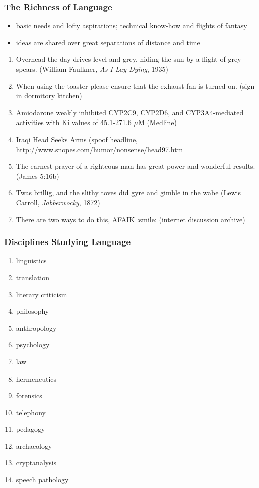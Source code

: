 \documentclass{beamer}             %
\begin{document}
\begin{frame}
\frametitle{The Richness of Language}
\begin{itemize}
\item basic needs and lofty aspirations; technical know-how and
  flights of fantasy
\item ideas are shared over great separations of distance and time
\end{itemize}

\scriptsize

\begin{enumerate}
\item Overhead the day drives level and grey, hiding the sun by a flight
   of grey spears.  (William Faulkner, \textit{As I Lay Dying}, 1935)
\item When using the toaster please ensure that the exhaust fan is turned
   on. (sign in dormitory kitchen)
\item Amiodarone weakly inhibited CYP2C9, CYP2D6, and CYP3A4-mediated
   activities with Ki values of 45.1-271.6 $\mu$M (Medline)
\item Iraqi Head Seeks Arms (spoof headline, \url{http://www.snopes.com/humor/nonsense/head97.htm}
\item The earnest prayer of a righteous man has great power and wonderful
   results. (James 5:16b)
\item Twas brillig, and the slithy toves did gyre and gimble in the wabe
   (Lewis Carroll, \textit{Jabberwocky}, 1872)
\item There are two ways to do this, AFAIK :smile:  (internet discussion archive)
\end{enumerate}
\end{frame}

\begin{frame}[fragile]
\frametitle{Disciplines Studying Language}
\begin{enumerate}
\item linguistics
\item translation
\item literary criticism
\item philosophy
\item anthropology
\item psychology
\item law
\item hermeneutics
\item forensics
\item telephony
\item pedagogy
\item archaeology
\item cryptanalysis
\item speech pathology
\end{enumerate}
\end{frame}
\end{document}
